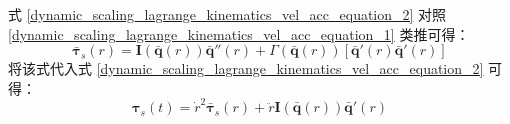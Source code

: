 \documentclass[cn,11pt,chinese,blue,bibstyle=ieeetr]{elegantbook}
\begin{document}
式 \ref{dynamic_scaling_lagrange_kinematics_vel_acc_equation_2} 对照 \ref{dynamic_scaling_lagrange_kinematics_vel_acc_equation_1} 类推可得：
\begin{equation}\label{dynamic_scaling_lagrange_kinematics_vel_acc_equation_3}
\bm{\bar{\tau}}_s\left(r\right) = \bm{I}\left(\bm{\bar{q}}\left(r\right)\right)\bm{\bar{q}}''\left(r\right) + \bm{\mathit{\Gamma}}\left(\bm{\bar{q}}\left(r\right)\right)\left[\bm{\bar{q}}'\left(r\right)\bm{\bar{q}}'\left(r\right)\right]
\end{equation}
将该式代入式 \ref{dynamic_scaling_lagrange_kinematics_vel_acc_equation_2} 可得：
\begin{equation}\label{dynamic_scaling_lagrange_kinematics_vel_acc_equation}
\bm{\tau}_s\left(t\right) = \dot{r}^2\bm{\bar{\tau}}_s\left(r\right) + \ddot{r}\bm{I}\left(\bm{\bar{q}}\left(r\right)\right)\bm{\bar{q}}'\left(r\right)
\end{equation}
\end{document}
